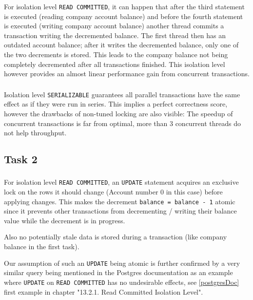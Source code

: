 \documentclass[11pt]{scrartcl}
\begin{document}
\subsubsection*{}
For isolation level {\tt\small READ COMMITTED}, it can happen that
after the third statement is executed (reading company account balance) and
before the fourth statement is executed (writing company account balance) another
thread commits a transaction writing the decremented balance. The first thread
then has an outdated account balance; after it writes the decremented balance, only
one of the two decrements is stored. This leads to the company balance not being
completely decremented after all transactions finished. This isolation level however
provides an almost linear performance gain from concurrent transactions.

\subsubsection*{}
Isolation level {\tt\small SERIALIZABLE} guarantees all parallel transactions
have the same effect as if they were run in series. This implies a perfect correctness
score, however the drawbacks of non-tuned locking are also visible: The speedup of concurrent
transactions is far from optimal, more than 3 concurrent threads do not help throughput.

\subsection*{Task 2}

\subsubsection*{}
For isolation level {\tt\small READ COMMITTED}, an {\tt\small UPDATE}
statement acquires an exclusive lock on the rows it should change (Account number 0
in this case) before applying changes.
This makes the decrement {\tt\small balance = balance - 1} atomic since it
prevents other transactions from decrementing / writing their balance value while the decrement
is in progress.

Also no potentially stale data is stored during a transaction (like company balance
in the first task).

Our assumption of such an {\tt\small UPDATE} being atomic is further confirmed by
a very similar query being mentioned in the Postgres documentation as an example
where {\tt\small UPDATE} on {\tt\small READ COMMITTED} has no undesirable effects,
see \ref{postgresDoc} first example in chapter "13.2.1. Read Committed Isolation Level".
\end{document}
